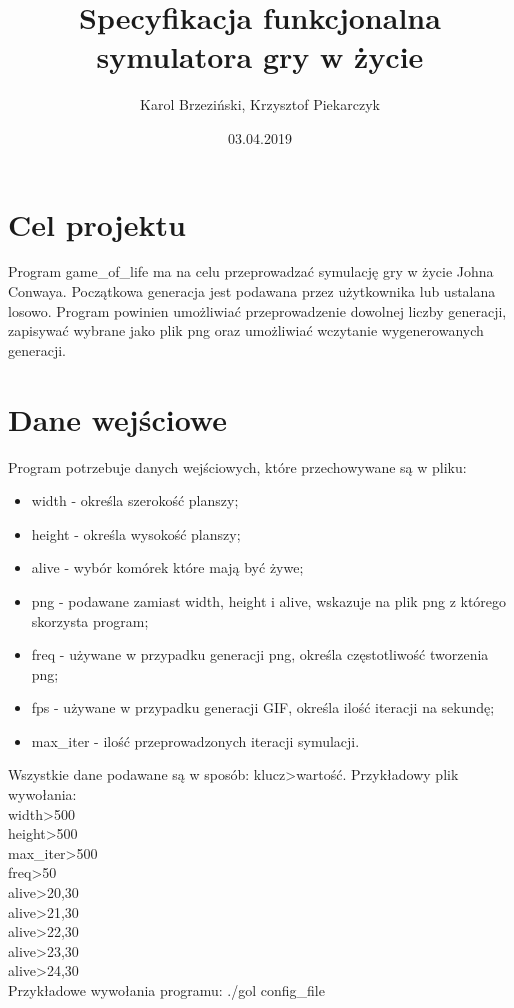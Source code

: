 \documentclass[12pt]{article}
\title{Specyfikacja funkcjonalna symulatora gry w życie}
\author{Karol Brzeziński, Krzysztof Piekarczyk}
\date{03.04.2019}
\begin{document}
\maketitle


\section{Cel projektu}

Program game\_of\_life ma na celu przeprowadzać symulację gry w życie Johna Conwaya. Początkowa generacja jest podawana przez użytkownika lub ustalana losowo. Program powinien umożliwiać przeprowadzenie dowolnej liczby generacji, zapisywać wybrane jako plik png oraz umożliwiać wczytanie wygenerowanych generacji.


\section{Dane wejściowe}

Program potrzebuje danych wejściowych, które przechowywane są w pliku:
\begin{itemize}
	\item width - określa szerokość planszy;
	\item height - określa wysokość planszy;
	\item alive - wybór komórek które mają być żywe;
	\item png - podawane zamiast width, height i alive, wskazuje na plik png z którego skorzysta program;
	\item freq - używane w przypadku generacji png, określa częstotliwość tworzenia png;
	\item fps - używane w przypadku generacji GIF, określa ilość iteracji na sekundę;
	\item max\_iter - ilość przeprowadzonych iteracji symulacji.
\end{itemize}

Wszystkie dane podawane są w sposób: klucz\textgreater{}wartość.
Przykładowy plik wywołania:\\
width\textgreater{}500\\
height\textgreater{}500\\
max\_iter\textgreater{}500\\
freq\textgreater{}50\\
alive\textgreater{}20,30\\
alive\textgreater{}21,30\\
alive\textgreater{}22,30\\
alive\textgreater{}23,30\\
alive\textgreater{}24,30\\
Przykładowe wywołania programu:	./gol config\_file
\end{document}
